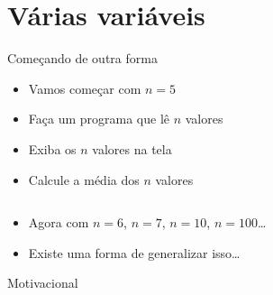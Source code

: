 \documentclass[14pt]{beamer}
\subtitle{Sequencial}
\begin{document}
	
	\begin{frame}
		\titlepage
	\end{frame}

	\begin{frame}
		\tableofcontents
	\end{frame}


	\section{Várias variáveis}
		\begin{frame}{Começando de outra forma}
			\begin{itemize}
				\presentationPause\item Vamos começar com $n=5$
				\presentationPause\item Faça um programa que lê $n$ valores
				\presentationPause\item Exiba os $n$ valores na tela
				\presentationPause\item Calcule a média dos $n$ valores
				\begin{columns}
					\begin{column}{.15\textwidth}
						\presentationPause
					\end{column}
					\begin{column}{.20\textwidth}
						\presentationPause
					\end{column}
					\begin{column}{.30\textwidth}
						\presentationPause
					\end{column}
					\begin{column}{.35\textwidth}
						\presentationPause
					\end{column}
				\end{columns}
				\presentationPause\item Agora com $n=6$, \presentationPause$n=7$, \presentationPause$n=10$, \presentationPause$n=100$\dots
				\presentationPause\item Existe uma forma de generalizar isso\dots
			\end{itemize}
		\end{frame}

		\begin{frame}{Motivacional}
			\presentationPause
		\end{frame}
\end{document}
